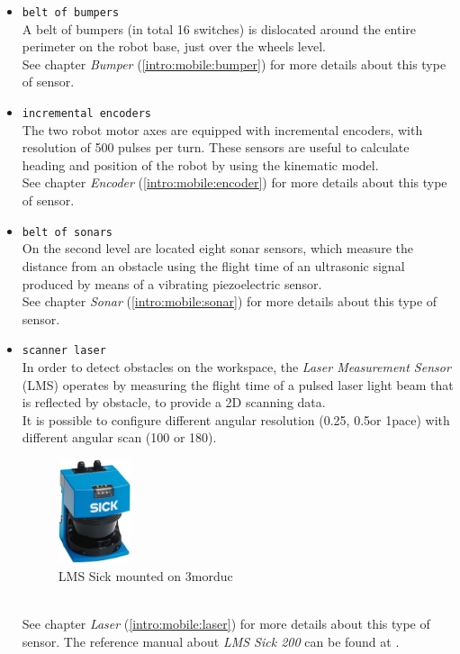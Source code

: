\begin{itemize}
\item \texttt{belt of bumpers} \\
  A belt of bumpers (in total 16 switches) is dislocated around
  the entire perimeter on the robot base, just over the wheels level. \\
  See chapter \textit{Bumper} (\ref{intro:mobile:bumper}) for more details
  about this type of sensor.

\item \texttt{incremental encoders} \\
  The two robot motor axes are equipped with incremental encoders, with
  resolution of 500 pulses per turn. These sensors are useful to calculate
  heading and position of the robot by using the kinematic model. \\  
  See chapter \textit{Encoder} (\ref{intro:mobile:encoder}) for more details
  about this type of sensor.
 
\item \texttt{belt of sonars} \\
  On the second level are located eight sonar sensors, which measure the
  distance from an obstacle using the flight time of an ultrasonic signal
  produced by means of a vibrating piezoelectric sensor. \\
  See chapter \textit{Sonar} (\ref{intro:mobile:sonar}) for more details
  about this type of sensor.

\item \texttt{scanner laser} \\
  In order to detect obstacles on the workspace, the \textit{Laser Measurement
  Sensor} (LMS) operates by measuring the flight time of a pulsed laser
  light beam that is reflected by obstacle, to provide a 2D scanning data. \\
  It is possible to configure different angular resolution (0.25\textdegree,
  0.5\textdegree or 1\textdegree pace) with different angular scan (100\textdegree
  or 180\textdegree).
  \begin{figure}[h]
    \begin{center}
      \includegraphics[width=60pt]{img/laser_sick_lms_200.jpg}
      \caption{LMS Sick mounted on 3morduc}
      \label{fig:laser_sick_lms_200}
    \end{center}
  \end{figure}
  \\
  See chapter \textit{Laser} (\ref{intro:mobile:laser}) for more details
  about this type of sensor. The reference manual about \textit{LMS
  Sick 200} can be found at \cite{3morduc:laser_sick_200}.


\end{itemize}
